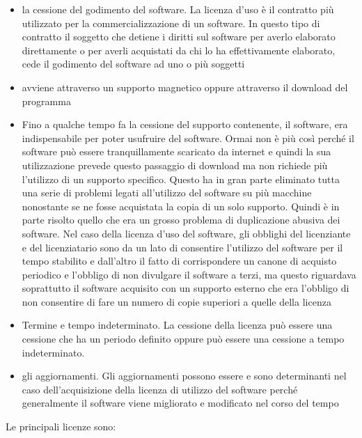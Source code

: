 \begin{itemize}
    \item la cessione del godimento del software. La licenza d'uso è il contratto più utilizzato per la commercializzazione di un software. In questo tipo di contratto il soggetto che detiene i diritti sul software per averlo elaborato direttamente o per averli acquistati da chi lo ha effettivamente elaborato, cede il godimento del software ad uno o più soggetti
    \item avviene attraverso un supporto magnetico oppure attraverso il download del programma
    \item Fino a qualche tempo fa la cessione del supporto contenente, il software, era indispensabile per poter usufruire del software. Ormai non è più così perché il software può essere tranquillamente scaricato da internet e quindi la sua utilizzazione prevede questo passaggio di download ma non richiede più l'utilizzo di un supporto specifico. Questo ha in gran parte eliminato tutta una serie di problemi legati all'utilizzo del software su più macchine nonostante se ne fosse acquistata la copia di un solo supporto. Quindi è in parte risolto quello che era un grosso problema di duplicazione abusiva dei software. Nel caso della licenza d'uso del software, gli obblighi del licenziante e del licenziatario sono da un lato di consentire l'utilizzo del software per il tempo stabilito e dall'altro il fatto di corrispondere un canone di acquisto periodico e l'obbligo di non divulgare il software a terzi, ma questo riguardava soprattutto il software acquisito con un supporto esterno che era l'obbligo di non consentire di fare un numero di copie superiori a quelle della licenza
    \item Termine e tempo indeterminato. La cessione della licenza può essere una cessione che ha un periodo definito oppure può essere una cessione a tempo indeterminato.
    \item gli aggiornamenti. Gli aggiornamenti possono essere e sono determinanti nel caso dell'acquisizione della licenza di utilizzo del software perché generalmente il software viene migliorato e modificato nel corso del tempo
\end{itemize}



Le principali licenze sono:

